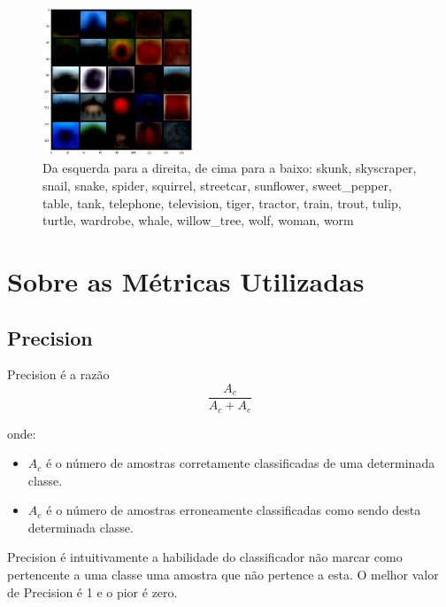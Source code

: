 \documentclass[conference]{IEEEtran}
\begin{document}
\begin{figure}[H]
\centerline{\includegraphics[width=0.4\textwidth]{Images/img_mean_norm4.png}}
\caption{\label{fig:img_mean_norm4}Da esquerda para a direita, de cima para a baixo: skunk, skyscraper, snail, snake, spider, squirrel, streetcar, sunflower, sweet\_pepper, table, tank, telephone, television, tiger, tractor, train, trout, tulip, turtle, wardrobe, whale, willow\_tree, wolf, woman, worm}
\end{figure}
    



\section{Sobre as Métricas Utilizadas}

\subsection{Precision}

Precision é a razão
    \begin{equation}
        \frac{A_c}{A_c + A_e}
    \end{equation}

    onde:

    \begin{itemize}
    \item $A_c$ é o número de amostras corretamente classificadas de uma determinada classe.
    \item $A_e$ é o número de amostras  erroneamente classificadas como sendo desta determinada classe.
    \end{itemize}

    Precision é intuitivamente a habilidade do classificador não marcar como pertencente a uma classe uma amostra que não pertence a esta. O melhor valor de Precision é 1 e o pior é zero.
    \cite{b7}
\end{document}
